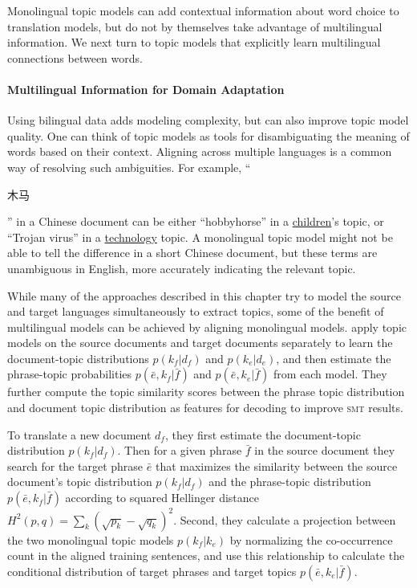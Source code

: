 Monolingual topic models can add contextual information about word choice to 
translation models, but do not by themselves take advantage of multilingual information.
We next turn to topic models that explicitly learn multilingual connections between words.

\paragraph{Multilingual Information for Domain Adaptation}

Using bilingual data adds modeling complexity, but can also improve topic model quality.
One can think of topic models as tools for disambiguating the meaning of words based on their context. 
Aligning across multiple languages is a common way of resolving such ambiguities.
 For example, ``\begin{CJK*}{UTF8}{gbsn}木马\end{CJK*}'' in a Chinese
  document can be either ``hobbyhorse'' in a \underline{children}'s
  topic, or ``Trojan virus'' in a \underline{technology} topic.  
  A monolingual topic model might not be able to tell the difference in a short Chinese document, but these terms
  are unambiguous in English, more accurately indicating the relevant topic.


While many of the approaches described in this chapter try to model the source and target
languages simultaneously to extract topics, some of the benefit of multilingual models can be achieved by aligning monolingual models. \citet{xiao-12} apply
topic models on the source documents and target documents separately
to learn the document-topic distributions $p(k_f | d_f)$ and $p(k_e |
d_e)$, and then estimate the phrase-topic probabilities $p(\bar{e}, k_f
| \bar{f})$ and $p(\bar{e}, k_e | \bar{f})$ from each model. They further
compute the topic similarity scores between the phrase topic
distribution and document topic distribution as features for decoding
to improve \textsc{smt} results.

To translate a new document $d_f$, they first estimate the document-topic distribution $p(k_f |
d_f)$.
Then for a given phrase $\bar{f}$ in the source document they search for the target phrase $\bar{e}$ that maximizes the similarity between the source document's topic distribution $p(k_f|d_f)$ and the phrase-topic distribution $p(\bar{e}, k_f|\bar{f})$ according to squared Hellinger distance $H^2(p,q) = \sum_k \left(\sqrt{p_k} - \sqrt{q_k} \right)^2$.
Second, they calculate a projection between the two monolingual topic models $p(k_f
| k_e)$  by normalizing the co-occurrence count in the aligned training
sentences, and use this relationship to calculate the conditional distribution of target phrases and target topics $p(\bar{e}, k_e|\bar{f})$.

